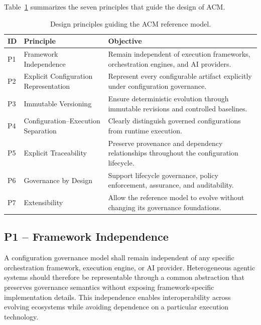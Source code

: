 \documentclass[10pt]{article}
\begin{document}
Table~\ref{tab:design_principles} summarizes the seven principles that guide the design of ACM.
\begin{table}[t]
\centering
\caption{Design principles guiding the ACM reference model.}
\label{tab:design_principles}

\renewcommand{\arraystretch}{1.15}

\begin{tabular}{p{1.0cm}p{4.0cm}p{9.2cm}}
\toprule
\textbf{ID} &
\textbf{Principle} &
\textbf{Objective}
\\
\midrule

P1 &
Framework Independence &
Remain independent of execution frameworks, orchestration engines, and AI providers.\\

P2 & Explicit Configuration Representation & Represent every configurable artifact explicitly under configuration governance.\\

P3 &  Immutable Versioning & Ensure deterministic evolution through immutable revisions and controlled baselines. \\

P4 & Configuration–Execution Separation & Clearly distinguish governed configurations from runtime execution.\\

P5 & Explicit Traceability & Preserve provenance and dependency relationships throughout the configuration lifecycle.\\

P6 & Governance by Design & Support lifecycle governance, policy enforcement, assurance, and auditability.\\

P7 & Extensibility & Allow the reference model to evolve without changing its governance foundations.
\\
\bottomrule
\end{tabular}

\end{table}

\subsection{P1 -- Framework Independence}

A configuration governance model shall remain independent of any specific orchestration framework, execution engine, or AI provider. Heterogeneous agentic systems should therefore be representable through a common abstraction that preserves governance semantics without exposing framework-specific implementation details. This independence enables interoperability across evolving ecosystems while avoiding dependence on a particular execution technology.
\end{document}
